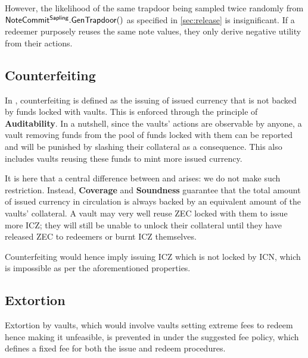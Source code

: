 However, the likelihood of the same trapdoor being sampled twice randomly from $\mathsf{NoteCommit^{Sapling}_{}}.\mathsf{GenTrapdoor()}$ as specified in \cref{sec:release} is insignificant.
If a redeemer purposely reuses the same note values, they only derive negative utility from their actions.

\subsection{Counterfeiting}
\label{sec:counterfeiting}

In \xclaim, counterfeiting is defined as the issuing of issued currency that is not backed by funds locked with vaults.
This is enforced through the principle of \textbf{Auditability}.
In a nutshell, since the vaults' actions are observable by anyone, a vault removing funds from the pool of funds locked with them can be reported and will be punished by slashing their collateral as a consequence.
This also includes vaults reusing these funds to mint more issued currency.

It is here that a central difference between \zclaim and \xclaim arises: we do not make such restriction.
Instead, \textbf{Coverage} and \textbf{Soundness} guarantee that the total amount of issued currency in circulation is always backed by an equivalent amount of the vaults' collateral.
A vault may very well reuse ZEC locked with them to issue more ICZ; they will still be unable to unlock their collateral until they have released ZEC to redeemers or burnt ICZ themselves.

Counterfeiting would hence imply issuing ICZ which is not locked by ICN, which is impossible as per the aforementioned properties.



\subsection{Extortion}
Extortion by vaults, which would involve vaults setting extreme fees to redeem hence making it unfeasible, is prevented in \zclaim under the suggested fee policy, which defines a fixed fee for both the issue and redeem procedures.

